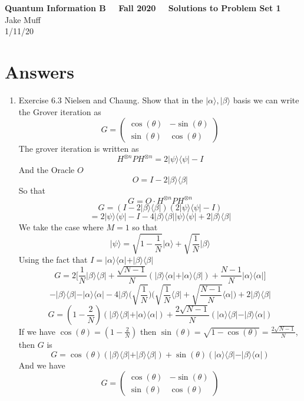 \documentclass[12pt]{article}
\newcommand{\ket}[1]{\vert{#1}\rangle}
\newcommand{\bra}[1]{\langle{#1}\vert}
\begin{document}
\normalsize

\baselineskip 14pt

\begin{center}
{\Large {\bf Quantum Information B \ \ Fall 2020 \ \  Solutions to Problem Set 1}} \\
Jake Muff \\
1/11/20
\end{center}

\bigskip
\section{Answers}



\begin{enumerate}
    \item Exercise 6.3 Nielsen and Chaung. Show that in the $\ket{\alpha}, \ket{\beta}$ basis we can write the Grover iteration as 
    $$ G = \left(\begin{array}{cc} \cos(\theta) & -\sin(\theta) \\  \sin(\theta) & \cos(\theta) \end{array}\right)$$
    The grover iteration is written as 
    $$ H^{\otimes n} P H^{\otimes n} = 2 \ket{\psi}\bra{\psi}-I $$
    And the Oracle $O$
    $$ O = I - 2 \ket{\beta}\bra{\beta} $$
    So that 
    $$ G = O \cdot H^{\otimes n} P H^{\otimes n} $$ 
    $$ G = (I - 2\ket{\beta}\bra{\beta})(2\ket{\psi}\bra{\psi}-I) $$
    $$ = 2\ket{\psi}\bra{\psi} - I - 4\ket{\beta}\bra{\beta}\ket{\psi}\bra{\psi} + 2\ket{\beta}\bra{\beta} $$
    We take the case where $M=1$ so that 
    $$ \ket{\psi} = \sqrt{1-\frac{1}{N}}\ket{\alpha}+ \sqrt{\frac{1}{N}}\ket{\beta} $$
    Using the fact that $I = \ket{\alpha}\bra{\alpha}+\ket{\beta}\bra{\beta}$ 
    $$ G = 2 \Big[ \frac{1}{N} \ket{\beta}\bra{\beta}+ \frac{\sqrt{N-1}}{N}(\ket{\beta}\bra{\alpha}+\ket{\alpha}\bra{\beta})+ \frac{N-1}{N} \ket{\alpha}\bra{\alpha} \Big] $$
    $$ - \ket{\beta}\bra{\beta}- \ket{\alpha}\bra{\alpha} - 4 \ket{\beta} \Big(\sqrt{\frac{1}{N}}\Big)\Big( \sqrt{\frac{1}{N}}\bra{\beta}+\sqrt{\frac{N-1}{N}} \bra{\alpha} \Big) + 2 \ket{\beta}\bra{\beta} $$
    $$ G = (1- \frac{2}{N})(\ket{\beta}\bra{\beta} + \ket{\alpha}\bra{\alpha}) + \frac{2 \sqrt{N-1}}{N}(\ket{\alpha}\bra{\beta}-\ket{\beta}\bra{\alpha}) $$
    If we have $\cos(\theta) = (1-\frac{2}{N})$ then $\sin(\theta) = \sqrt{1-\cos(\theta)} = \frac{2 \sqrt{N-1}}{N} $, then $G$ is 
    $$ G = \cos(\theta)(\ket{\beta}\bra{\beta} + \ket{\beta}\bra{\beta}) + \sin(\theta)(\ket{\alpha}\bra{\beta}-\ket{\beta}\bra{\alpha}) $$
    And we have 
    $$ G = \left(\begin{array}{cc} \cos(\theta) & -\sin(\theta) \\  \sin(\theta) & \cos(\theta) \end{array}\right)$$


\end{enumerate}
\end{document}
